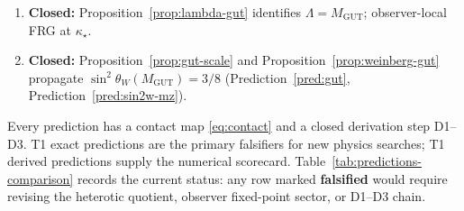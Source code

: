\begin{enumerate}[label=\textbf{D\arabic*.},leftmargin=*]
\begin{enumerate}[label=\textit{D3.\alph*.},leftmargin=2em]
        $\tau_{\mathrm{EW}}$ and $\langle\mathbf{10}_H\rangle$ from $V$
        along $g_\iota$ (Remark~\ref{rmk:tau-ew}).
      \item \textbf{Closed:} Proposition~\ref{prop:lambda-gut} identifies
        $\Lambda=M_{\mathrm{GUT}}$; observer-local FRG at $\kappa_\star$.
      \item \textbf{Closed:} Proposition~\ref{prop:gut-scale} and
        Proposition~\ref{prop:weinberg-gut} propagate
        $\sin^2\theta_W(M_{\mathrm{GUT}})=3/8$ (Prediction~\ref{pred:gut},
        Prediction~\ref{pred:sin2w-mz}).
    \end{enumerate}
\end{enumerate}

\begin{remark}
Every prediction has a contact map \eqref{eq:contact} and a closed derivation
step D1--D3. T1 exact predictions are the primary falsifiers for new physics
searches; T1 derived predictions supply the numerical scorecard.
Table~\ref{tab:predictions-comparison} records the current status: any row
marked \textbf{falsified} would require revising the heterotic quotient,
observer fixed-point sector, or D1--D3 chain.
\end{remark}